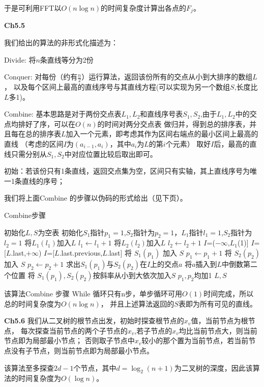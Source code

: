 \documentclass{article}
\begin{document}
于是可利用FFT以$O(n\log n)$的时间复杂度计算出各点的$F_j$。

\textbf{Ch5.5}

我们给出的算法的非形式化描述为：

Divide: 将$n$条直线等分为2份

Conquer: 对每份（约有$\frac{n}{2}$）运行算法，返回该份所有的交点从小到大排序的数组$L$，
以及每个区间上最高的直线序号与其直线方程(可以实现为另一个数组$S$,长度比$L$多1)。

Combine: 基本思路是对于两份交点表$L_1,L_2$和直线序号表$S_1,S_2$,由于$L_1,L_2$中的交点均排好了序，可以在$O(n)$的时间对两分交点表
做归并，得到总的排序表，并且每在总的排序表$L$加入一个元素，即考虑其作为区间右端点的最小区间上最高的直线
（考虑的区间$I$为$(a_{i-1},a_i)$，其中$a_i$为$L$的第$i$个元素）
取好$I$后，最高的直线只需分别从$S_1,S_2$中对应位置比较后取出即可。

初始：若该份只有1条直线，返回交点集为空，区间只有实轴，其上直线序号为唯一1条直线的序号；

我们将上面Combine 的步骤以伪码的形式给出（见下页）。
\begin{algorithm}
\caption{Combine步骤}
\begin{algorithmic}[1]
\STATE 初始化$L,S$为空表
\STATE 初始化$S_1$指针$p_1=1$,$S_2$指针为$p_2=1$，$L_1$指针$l_1=1$,$S_2$指针为$l_2=1$
\STATE 将$L_1(l_1)$加入$L$
\STATE $l_1\leftarrow l_1+1$ 
\ELSE
\STATE 将$L_2(l_2)$加入$L$
\STATE $l_2\leftarrow l_2+1$
\ENDIF
{}
\STATE $I$=($-\infty$,$L_1$(1)]
\STATE $I$=[$L$.last,$+\infty$)
\ELSE
\STATE $I$=[$L$.last.previous,$L$.last]
\ENDIF
{}
    \STATE 将 $S_1(p_1)$ 加入 $S$
    \STATE $p_1 \leftarrow p_1+1$
    \ELSE
    \STATE 将 $S_2(p_2)$ 加入 $S$
    \STATE $p_2 \leftarrow p_2+1$
    \ENDIF
\ELSE
\STATE 求出$S_1(p_1)$与$S_2(p_2)$在$I$上的交点$a$
\STATE 将$a$插入到$L$中倒数第二个位置
\STATE 将 $S_1(p_1),S_2(p_2)$按斜率从小到大依次加入$S$
\STATE $p_1,p_2$均加1
\ENDIF
\ENDWHILE
\RETURN $L,S$
\end{algorithmic}
\end{algorithm}

该算法Combine 步骤 While 循环只有n步，单步循环可用$O(1)$时间完成，所以总的时间复杂度为$O(n\log n)$，
并且上述算法返回的$S$表即为所有可见的直线。

\textbf{Ch5.6}
我们从二叉树的根节点出发，初始时探查根节点的$x_v$值，当前节点为根节点，
每次探查当前节点的两个子节点的$x_v$,若子节点的$x_v$均比当前节点大，则当前节点即为局部最小节点；
否则取子节点中$x_v$较小的那个置为当前节点，若当前节点没有子节点，则当前节点即为局部最小节点。

该算法至多探查$2d-1$个节点，其中$d=\log_2 (n+1)$为二叉树的深度，因此该算法的时间复杂度为$O(\log n)$。
\end{document}
